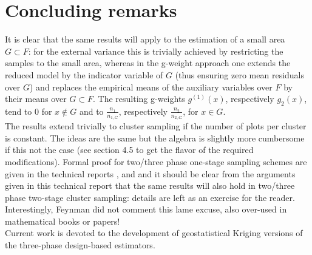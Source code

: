 \documentclass[a4paper,12pt,leqno, titlepage]{article}
\begin{document}
\section{Concluding remarks}
It is clear that the same results will apply to the estimation of a small area $G\subset F$: for the external variance this is trivially achieved by restricting the samples to the small area, whereas in the g-weight approach one extends the reduced model by the indicator variable of $G$ (thus ensuring zero mean residuals over $G$) and replaces the empirical means of the auxiliary variables over $F$ by their means over $G\subset F$. The resulting g-weights $g^{(1)}(x)$, respectively $g_2(x)$, tend to $0$ for $x\not\in{G}$ and to $\frac{n_1}{n_{1,G}}$, respectively $\frac{n_2}{n_{2,G}}$, for $x\in{G}$.\\
The results extend trivially to cluster sampling if the number of plots per cluster is constant. The ideas are the same but the algebra is slightly more cumbersome if this not the case (see \cite{mandallaz} section 4.5 to get the flavor of the required modifications). Formal proof for two/three phase one-stage sampling schemes are given in the technical reports \cite{mandallazreport1}, \cite{mandallazreport2} and \cite{mandallazreport3} and it should be clear from the arguments given in this technical report that the same results will also hold in two/three phase two-stage cluster sampling: details are left as an exercise for the reader. Interestingly, Feynman did not comment this lame excuse, also over-used in mathematical books or papers!\\
Current work is devoted to the development of geostatistical Kriging versions of the three-phase design-based estimators.

\newpage

\end{document}
